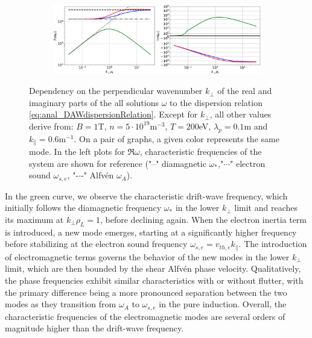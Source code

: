 \begin{figure}[H]
	\ContinuedFloat
	\centering
	\begin{subfigure}[t]{0.85\textwidth}
		\centering
		\includegraphics[width=1\textwidth]{schemes/modes_EM-flutter.jpg}
		\label{fig:anal_modesFlutter}
	\end{subfigure}
	\caption[Dependency on the perpendicular wavenumber $k_\perp$ of the real and imaginary parts of the all solutions $\omega$ to the dispersion relation \ref{eq:anal_DAWdispersionRelation}]{Dependency on the perpendicular wavenumber $k_\perp$ of the real and imaginary parts of the all solutions $\omega$ to the dispersion relation \ref{eq:anal_DAWdispersionRelation}. Except for $k_\perp$, all other values derive from: $B = 1$T, $n = 5\cdot10^{19}$m$^{-3}$, $T = 200$eV, $\lambda_p = 0.1$m and $k_\parallel = 0.6$m$^{-1}$. On a pair of graphs, a given color represents the same mode. In the left plots for $\Re{\omega}$, characteristic frequencies of the system are shown for reference ("--" diamagnetic $\omega_*$,"$\cdots$" electron sound $\omega_{s,e}$, "-$\cdot$-" Alfvén $\omega_A$).} 
	\label{fig:anal_modalBehavior}
\end{figure}

In the green curve, we observe the characteristic drift-wave frequency, which initially follows the diamagnetic frequency $\omega_*$ in the lower $k_\perp$ limit and reaches its maximum at $k_\perp \rho_L = 1$, before declining again. When the electron inertia term is introduced, a new mode emerges, starting at a significantly higher frequency before stabilizing at the electron sound frequency $\omega_{s,e} = v_{th,e} k_\parallel$. The introduction of electromagnetic terms governs the behavior of the new modes in the lower $k_\perp$ limit, which are then bounded by the shear Alfvén phase velocity. Qualitatively, the phase frequencies exhibit similar characteristics with or without flutter, with the primary difference being a more pronounced separation between the two modes as they transition from $\omega_A$ to $\omega_{s,e}$ in the pure induction. Overall, the characteristic frequencies of the electromagnetic modes are several orders of magnitude higher than the drift-wave frequency.


